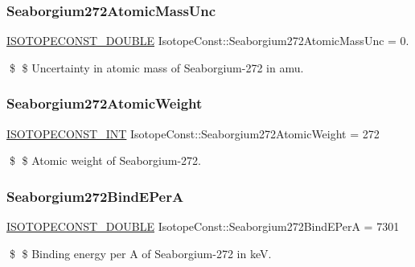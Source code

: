\subsubsection{\texorpdfstring{Seaborgium272\+Atomic\+Mass\+Unc}{Seaborgium272AtomicMassUnc}}
{\footnotesize\ttfamily \mbox{\hyperlink{group___isotope_const-_macros_ga8f45a7272ce02c0b4c65c44636ed719a}{I\+S\+O\+T\+O\+P\+E\+C\+O\+N\+S\+T\+\_\+\+D\+O\+U\+B\+LE}} Isotope\+Const\+::\+Seaborgium272\+Atomic\+Mass\+Unc = 0.}

\$ \$ Uncertainty in atomic mass of Seaborgium-\/272 in amu. \mbox{\label{group___isotope_const-_seaborgium-_sg272_ga2ed821c10fb0a9ccc203ee2ac43906ee}} 
\subsubsection{\texorpdfstring{Seaborgium272\+Atomic\+Weight}{Seaborgium272AtomicWeight}}
{\footnotesize\ttfamily \mbox{\hyperlink{group___isotope_const-_macros_ga5f18360b3e99483a35c32d789e62621c}{I\+S\+O\+T\+O\+P\+E\+C\+O\+N\+S\+T\+\_\+\+I\+NT}} Isotope\+Const\+::\+Seaborgium272\+Atomic\+Weight = 272}

\$ \$ Atomic weight of Seaborgium-\/272. \mbox{\label{group___isotope_const-_seaborgium-_sg272_ga97f8f6be0e4da7f878bdc39344204aa3}} 
\subsubsection{\texorpdfstring{Seaborgium272\+Bind\+E\+PerA}{Seaborgium272BindEPerA}}
{\footnotesize\ttfamily \mbox{\hyperlink{group___isotope_const-_macros_ga8f45a7272ce02c0b4c65c44636ed719a}{I\+S\+O\+T\+O\+P\+E\+C\+O\+N\+S\+T\+\_\+\+D\+O\+U\+B\+LE}} Isotope\+Const\+::\+Seaborgium272\+Bind\+E\+PerA = 7301}

\$ \$ Binding energy per A of Seaborgium-\/272 in keV. \mbox{\label{group___isotope_const-_seaborgium-_sg272_ga3fc9c779a8b732e7f76b634f54ff6c61}} 
